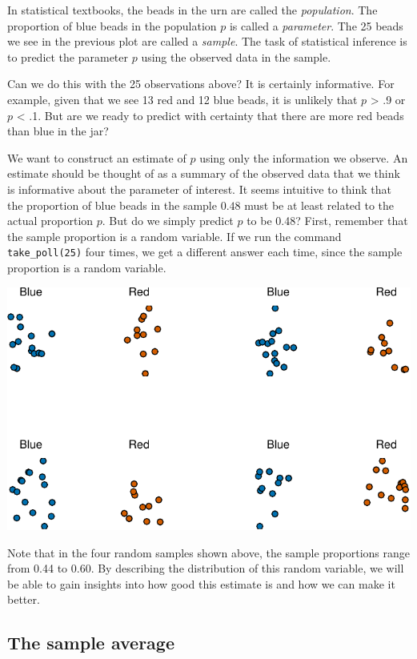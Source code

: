 \documentclass[openany]{book}
\begin{document}
In statistical textbooks, the beads in the urn are called the \emph{population}. The proportion of blue beads in the population \(p\) is called a \emph{parameter}. The 25 beads we see in the previous plot are called a \emph{sample}. The task of statistical inference is to predict the parameter \(p\) using the observed data in the sample.

Can we do this with the 25 observations above? It is certainly informative. For example, given that we see 13 red and 12 blue beads, it is unlikely that \(p\) \textgreater{} .9 or \(p\) \textless{} .1. But are we ready to predict with certainty that there are more red beads than blue in the jar?

We want to construct an estimate of \(p\) using only the information we observe. An estimate should be thought of as a summary of the observed data that we think is informative about the parameter of interest. It seems intuitive to think that the proportion of blue beads in the sample \(0.48\) must be at least related to the actual proportion \(p\). But do we simply predict \(p\) to be 0.48? First, remember that the sample proportion is a random variable. If we run the command \texttt{take\_poll(25)} four times, we get a different answer each time, since the sample proportion is a random variable.

\begin{center}\includegraphics[width=0.7\linewidth]{dsbook_files/figure-latex/four-simulated-polls-1} \end{center}

Note that in the four random samples shown above, the sample proportions range from 0.44 to 0.60. By describing the distribution of this random variable, we will be able to gain insights into how good this estimate is and how we can make it better.

\hypertarget{the-sample-average}{%
\subsection{The sample average}\label{the-sample-average}}
\end{document}
